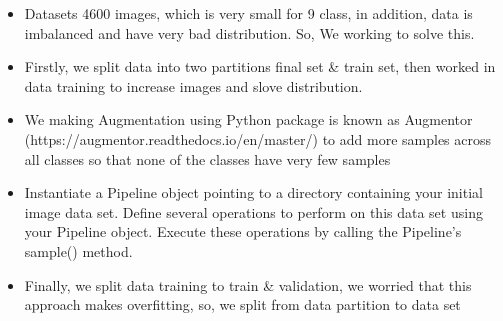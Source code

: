 \documentclass{article}
\begin{document}
	 \begin{itemize}
	 	\item Datasets  4600 images, which is very small for 9 class, in addition, data is imbalanced and have very bad distribution.
	 	So, We working to solve this.
	 	\item Firstly, we split data into two partitions final set \& train set, then worked in data training to increase images and slove distribution.
	 	\item We making Augmentation using 
	 	Python package is known as Augmentor (https://augmentor.readthedocs.io/en/master/) to add more samples across all classes so that none of the classes have very few samples
	 	\item Instantiate a Pipeline object pointing to a directory containing your initial image data set.
	 	Define several operations to perform on this data set using your Pipeline object.
	 	Execute these operations by calling the Pipeline’s sample() method.
	 	\item Finally, we split data training to train \& validation, we worried that this approach makes overfitting, so, we split from data partition to data set	 	
	\end{itemize}
\end{document}
